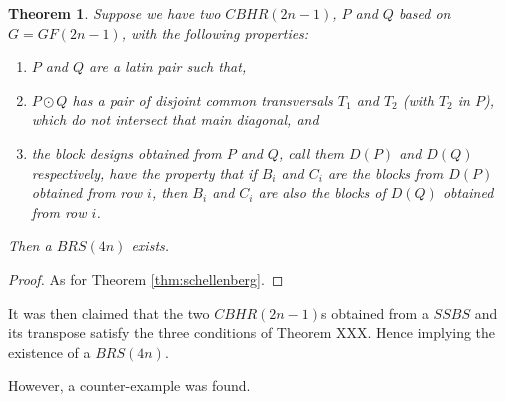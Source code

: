 \documentclass[
  11pt,
  a4paper]{book}
\newtheorem{theorem}{Theorem}
\newcounter{example}
\begin{document}
\begin{theorem}
Suppose we have two $CBHR(2n - 1)$, $P$ and $Q$ based on
$G = GF(2n - 1)$, with the following properties:
\begin{enumerate}
  \item{$P$ and $Q$ are a latin pair such that,}
  \item{$P \odot Q$ has a pair of disjoint
    \emph{common transversals} $T_1$ and $T_2$
    (with $T_2$ in $P$), which do not intersect that main
    diagonal, and}
  \item{the block designs obtained from $P$ and $Q$, call
    them $D(P)$ and $D(Q)$ respectively, have the property
    that if $B_i$ and $C_i$ are the blocks from $D(P)$
    obtained from row $i$, then $B_i$ and $C_i$
    are also the blocks of $D(Q)$ obtained from row $i$.}
\end{enumerate}

Then a $BRS(4n)$ exists.
\end{theorem}

\begin{proof}
As for Theorem \ref{thm:schellenberg}.
\end{proof}

It was then claimed that the two \(CBHR(2n - 1)\)s obtained from a
\(SSBS\) and its transpose satisfy the three conditions of Theorem XXX.
Hence implying the existence of a \(BRS(4n)\).

However, a counter-example was found.
\end{document}
